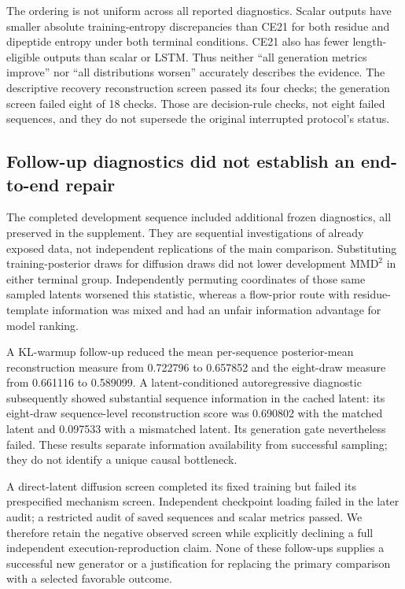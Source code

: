 \documentclass[12pt,a4paper]{article}
\newcommand{\mmd}{\mathrm{MMD}^{2}}
\begin{document}
The ordering is not uniform across all reported diagnostics. Scalar outputs have smaller absolute training-entropy discrepancies than CE21 for both residue and dipeptide entropy under both terminal conditions. CE21 also has fewer length-eligible outputs than scalar or LSTM. Thus neither ``all generation metrics improve'' nor ``all distributions worsen'' accurately describes the evidence. The descriptive recovery reconstruction screen passed its four checks; the generation screen failed eight of 18 checks. Those are decision-rule checks, not eight failed sequences, and they do not supersede the original interrupted protocol's status.

\subsection{Follow-up diagnostics did not establish an end-to-end repair}
The completed development sequence included additional frozen diagnostics, all preserved in the supplement. They are sequential investigations of already exposed data, not independent replications of the main comparison. Substituting training-posterior draws for diffusion draws did not lower development $\mmd$ in either terminal group. Independently permuting coordinates of those same sampled latents worsened this statistic, whereas a flow-prior route with residue-template information was mixed and had an unfair information advantage for model ranking.

A KL-warmup follow-up reduced the mean per-sequence posterior-mean reconstruction measure from 0.722796 to 0.657852 and the eight-draw measure from 0.661116 to 0.589099. A latent-conditioned autoregressive diagnostic subsequently showed substantial sequence information in the cached latent: its eight-draw sequence-level reconstruction score was 0.690802 with the matched latent and 0.097533 with a mismatched latent. Its generation gate nevertheless failed. These results separate information availability from successful sampling; they do not identify a unique causal bottleneck.

A direct-latent diffusion screen completed its fixed training but failed its prespecified mechanism screen. Independent checkpoint loading failed in the later audit; a restricted audit of saved sequences and scalar metrics passed. We therefore retain the negative observed screen while explicitly declining a full independent execution-reproduction claim. None of these follow-ups supplies a successful new generator or a justification for replacing the primary comparison with a selected favorable outcome.
\end{document}
